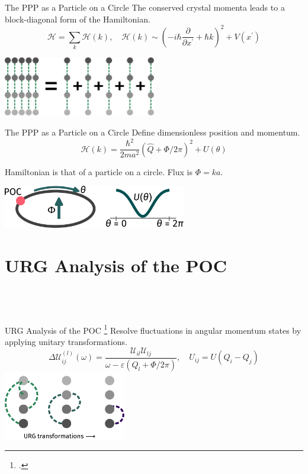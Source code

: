 \documentclass[aspectratio=169]{beamer}
\begin{document}
\begin{frame}{The PPP as a Particle on a Circle}
	The conserved crystal momenta leads to a \alert{block-diagonal} form of the Hamiltonian.
	\[\mathcal{H} = \sum_k \mathcal{H}(k), \quad \mathcal{H}(k) \sim \left( -i\hbar\frac{\partial}{\partial x^\prime} + \hbar k\right)^2 + V(x^\prime)\]

	\vspace*{\fill}
	\includegraphics[width=0.5\textwidth]{decomposition.pdf}
\end{frame}

\begin{frame}{The PPP as a Particle on a Circle}
	Define dimensionless position and momentum.
	\[\mathcal{H}(k) = \frac{\hbar^2}{2ma^2}\left(\hat Q + \Phi/2\pi\right)^2 + U(\theta)\]

	\vspace*{\fill}
	Hamiltonian is that of a \alert{particle on a circle}. Flux is \(\Phi = ka\).

	\vspace*{\fill}
	\includegraphics[width=0.6\textwidth]{POC.pdf}
\end{frame}

\section{URG Analysis of the POC}
\subsection{~}

\begin{frame}{URG Analysis of the POC}
	\footcite{AnirbanThesis}
	\alert{Resolve fluctuations} in angular momentum states by applying unitary transformations.
	\[\Delta \mathcal{U}_{ij}^{(l)}(\omega) = \frac{\mathcal{U}_{il}\mathcal{U}_{lj}}{\omega - \varepsilon(Q_l + \Phi/2\pi)},\quad U_{ij} = U(Q_i - Q_j)\]
	\includegraphics[width=0.4\textwidth]{URG_poc.pdf}
\end{frame}
\end{document}
